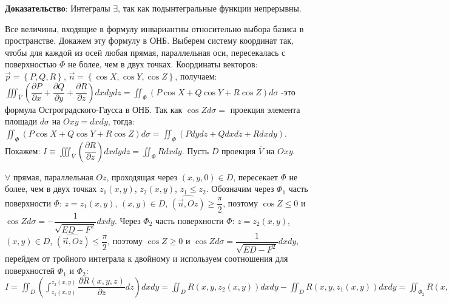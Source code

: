 \par \textbf{Доказательство}: Интегралы $\exists$, так как подынтегральные функции непрерывны.
\par Все величины, входящие в формулу инвариантны относительно выбора базиса в пространстве. Докажем эту формулу в ОНБ. Выберем систему координат так, чтобы для каждой из осей любая прямая, параллельная оси, пересекалась с поверхностью $\Phi$ не более, чем в двух точках. Координаты векторов: $\overrightarrow{p}=\left\{ P,Q,R\right\}$, $\overrightarrow{n}=\left\{ \cos X,\cos Y,\cos Z\right\}$, получаем: $\iiint _{\overline{V}}\left( \dfrac{\partial P}{\partial x}+\dfrac{\partial Q}{\partial y}+\dfrac{\partial R}{\partial z}\right) dxdydz=\iint _{\Phi }(P\cos X+Q\cos Y+R\cos Z)d\sigma$ -это формула Остроградского-Гаусса в ОНБ. Так как $\cos Zd\sigma=$ проекция элемента площади $d\sigma$ на $Oxy=dxdy$, тогда: $\iint _{\Phi }(P\cos X+Q\cos Y+R\cos Z)d\sigma=\iint _{\Phi }(Pdydz+Qdxdz+Rdxdy)$. Покажем: $I\equiv \iiint _{\overline{V}}\left( \dfrac{\partial R}{\partial z}\right)dxdydz=\iint _{\Phi }Rdxdy$. Пусть $D$ проекция $\overline{V}$ на $Oxy$.
\par $\forall$ прямая, параллельная $Oz$, проходящая через $\left( x,y,0\right)\in D$, пересекает $\Phi$ не более, чем в двух точках $z_{1}\left( x,y\right)$, $z_{2}\left( x,y\right)$, $z_{1}\leq z_{2}$. Обозначим через $\Phi _{1}$ часть поверхности $\Phi$: $z=z_{1}\left( x,y\right)$, $\left( x,y\right) \in D$, $\widehat{\left( \overrightarrow{n},Oz\right)}\geq\dfrac{\pi }{2}$, 
поэтому $\cos Z \leq 0 $ и $\cos Z d\sigma=-\dfrac{1}{\sqrt{ED-F^{2}}}dxdy$. Через $\Phi _{2}$ часть поверхности $\Phi$: $z=z_{2}\left( x,y\right)$, $\left( x,y\right) \in D$, $\widehat{\left( \overrightarrow{n},Oz\right)}\leq\dfrac{\pi }{2}$, поэтому $\cos Z \geq 0 $ и $\cos Z d\sigma=\dfrac{1}{\sqrt{ED-F^{2}}}dxdy$, перейдем от тройного интеграла к двойному и используем соотношения для поверхностей $\Phi _{1}$ и $\Phi _{2}$: $I=\iint _{D}\left( \int ^{z_{2}\left( x,y\right)}_{z_{1}\left( x,y\right)}\dfrac{\partial R\left( x,y,z\right)}{\partial z}dz\right)dxdy=\iint _{D}R\left( x,y,z_{2}\left( x,y\right) \right)dxdy-\iint _{D}R\left( x,y,z_{1}\left( x,y\right) \right)dxdy=\iint _{\Phi _{2}}R\left( x,y,z \right)\cos Z d\sigma-(-\iint _{\Phi _{1}}R\left( x,y,z \right)\cos Z d\sigma)=\iint _{\Phi _{2}}R\left( x,y,z \right)dxdy+\iint _{\Phi _{1}}R\left( x,y,z \right)dxdy=\iint _{\Phi}R\left( x,y,z \right)dxdy$

